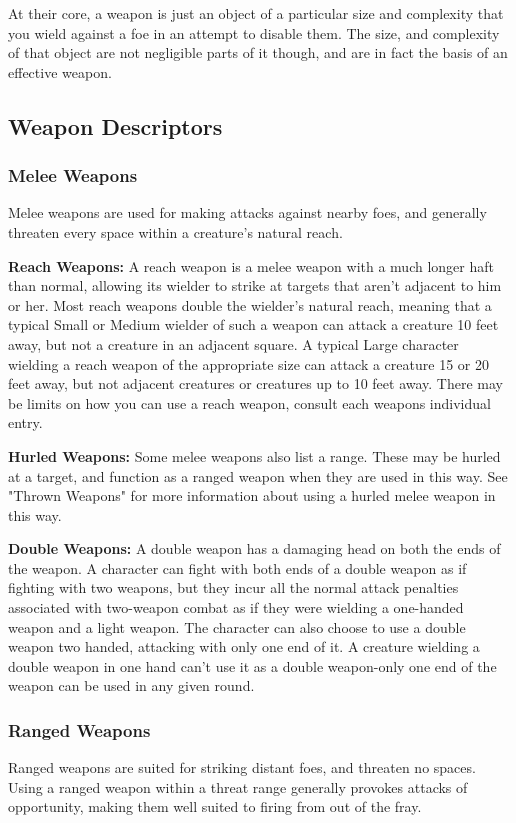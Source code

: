At their core, a weapon is just an object of a particular size and complexity that you wield against a foe in an attempt to disable them. The size, and complexity of that object are not negligible parts of it though, and are in fact the basis of an effective weapon.

\subsection{Weapon Descriptors}

\subsubsection{Melee Weapons}
Melee weapons are used for making attacks against nearby foes, and generally threaten every space within a creature's natural reach.

\textbf{Reach Weapons:} A reach weapon is a melee weapon with a much longer haft than normal, allowing its wielder to strike at targets that aren't adjacent to him or her. Most reach weapons double the wielder's natural reach, meaning that a typical Small or Medium wielder of such a weapon can attack a creature 10 feet away, but not a creature in an adjacent square. A typical Large character wielding a reach weapon of the appropriate size can attack a creature 15 or 20 feet away, but not adjacent creatures or creatures up to 10 feet away. There may be limits on how you can use a reach weapon, consult each weapons individual entry. 

\textbf{Hurled Weapons:} Some melee weapons also list a range. These may be hurled at a target, and function as a ranged weapon when they are used in this way. See "Thrown Weapons" for more information about using a hurled melee weapon in this way.

\textbf{Double Weapons:} A double weapon has a damaging head on both the ends of the weapon. A character can fight with both ends of a double weapon as if fighting with two weapons, but they incur all the normal attack penalties associated with two-weapon combat as if they were wielding a one-handed weapon and a light weapon. The character can also choose to use a double weapon two handed, attacking with only one end of it. A creature wielding a double weapon in one hand can't use it as a double weapon-only one end of the weapon can be used in any given round. 

\subsubsection{Ranged Weapons}
Ranged weapons are suited for striking distant foes, and threaten no spaces. Using a ranged weapon within a threat range generally provokes attacks of opportunity, making them well suited to firing from out of the fray.

